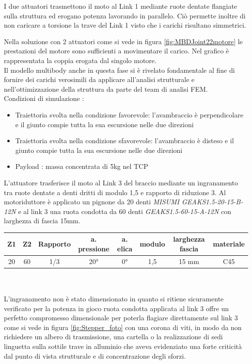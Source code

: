 \documentclass[%
corpo=11pt,
twoside,
 stile=classica,
oldstyle,
greek,%
]{toptesi}
\begin{document}
		
		I due attuatori trasmettono il moto al Link 1 mediante ruote dentate flangiate sulla struttura ed erogano potenza lavorando in parallelo. Ciò permette inoltre di non caricare a torsione la trave del Link 1 visto che i carichi risultano simmetrici. 
		
		Nella soluzione con 2 attuatori come si vede in figura \ref{fig:MBDJoint22motore} le prestazioni del motore sono sufficienti a movimentare il carico. Nel grafico è rappresentata la coppia erogata dal singolo motore.\\
		Il modello multibody anche in questa fase si è rivelato fondamentale al fine di fornire dei carichi verosimili da applicare all'analisi strutturale e nell'ottimizzazione della struttura da parte del team di analisi FEM. 
		\\
			Condizioni di simulazione :
		\begin{itemize}
			\item Traiettoria svolta nella condizione favorevole: l'avambraccio è perpendicolare e il giunto compie tutta la sua escursione nelle due direzioni 
			\item Traiettoria svolta nella condizione sfavorevole: l'avambraccio è disteso e il giunto compie tutta la sua escursione nelle due direzioni 
			\item Payload : massa concentrata di 5kg nel TCP 
		\end{itemize}
		L'attuatore trasferisce il moto al Link 3 del braccio mediante un ingranamento tra ruote dentate a denti dritti di modulo 1,5 e rapporto di riduzione 3. Al motoriduttore è applicato un pignone da 20 denti \textit{MISUMI GEAKS1.5-20-15-B-12N} e al link 3 una ruota condotta da 60 denti \textit{GEAKS1.5-60-15-A-12N} con larghezza di fascia 15mm. \\
		
			\begin{tabular}{|c|c|c|c|c|c|c|c|}
			
			\hline
			Z1 & Z2 & Rapporto & a. pressione & a. elica & modulo & larghezza fascia & materiale \\
			\hline
			20 & 60 & 1/3 & 20° & 0°  & 1,5 & 15 mm & C45  \\
			\hline
			
		\end{tabular}
		\\
		\\
		L'ingranamento non è stato dimensionato in quanto si ritiene sicuramente verificato per la potenza in gioco  ruota condotta applicata al link 3 offre un perfetto compromesso dimensionale per poterla flagiare direttamente sul link 3 come si vede in figura \ref{fig:Stepper_foto} con una corona di viti, in modo da non richiedere un albero di trasmissione, una cartella o la realizzazione di sedi linguetta sulla sottile trave in alluminio che aveva evidenziato una forte criticità dal punto di vista strutturale e di concentrazione degli sforzi. \\
		
\end{document}
